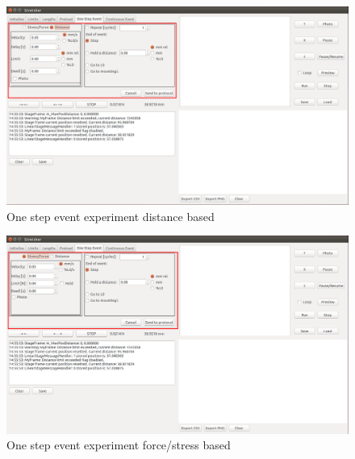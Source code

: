 \begin{figure}[!ht]
	\centering
		\includegraphics[width=1.0\textwidth]{images/OneStepEventDistance}
	\caption{One step event experiment distance based}
	\label{fig:onestepeventdistance}
\end{figure}

\begin{figure}[!ht]
	\centering
		\includegraphics[width=1.0\textwidth]{images/OneStepEventStressForce}
	\caption{One step event experiment force/stress based}
	\label{fig:onestepeventforcestress}
\end{figure}

